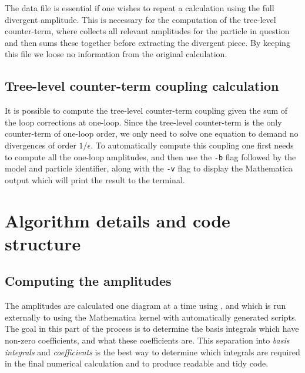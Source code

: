 The \mathematica data file is essential if one wishes to repeat a calculation using the full divergent amplitude.  This is necessary for the computation of the tree-level counter-term, where \mb collects all relevant amplitudes for the particle in question and then sums these together before extracting the divergent piece.  By keeping this file we loose no information from the original calculation.

\subsection{Tree-level counter-term coupling calculation}\label{sec:ct}

It is possible to compute the tree-level counter-term coupling given the sum of the loop corrections at one-loop.  Since the tree-level counter-term is the only counter-term of one-loop order, we only need to solve one equation to demand no divergences of order $1/\epsilon$.  To automatically compute this coupling one first needs to compute all the one-loop amplitudes, and then use the \lstinline{-b} flag followed by the model and particle identifier, along with the \lstinline{-v} flag to display the Mathematica output which will print the result to the terminal.

\section{Algorithm details and code structure}

\subsection{Computing the amplitudes}\label{sec:amplitudes}

The amplitudes are calculated one diagram at a time using \feynartss, \feyncalc and \tarcer which is run externally to \CC using the Mathematica kernel with automatically generated scripts.  The goal in this part of the process is to determine the basis integrals which have non-zero coefficients, and what these coefficients are.  This separation into \textit{basis integrals} and \textit{coefficients} is the best way to determine which integrals are required in the final numerical calculation and to produce readable and tidy code.

